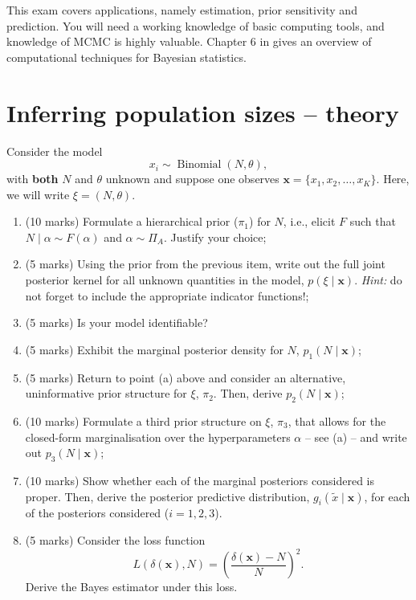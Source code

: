 \documentclass[a4paper,10pt, notitlepage]{report}
\begin{document}
This exam covers applications, namely estimation, prior sensitivity and prediction.
You will need a working knowledge of basic computing tools, and knowledge of MCMC is highly valuable.
Chapter 6 in \cite{Robert2007} gives an overview of computational techniques for Bayesian statistics.

\section*{Inferring population sizes -- theory}

Consider the model
\begin{equation*}
 x_i \sim \operatorname{Binomial}(N, \theta),
\end{equation*}
with \textbf{both} $N$ and $\theta$ unknown and suppose one observes $\boldsymbol{x} = \{x_1, x_2, \ldots, x_K\}$.
Here, we will write $\xi = (N, \theta)$.

\begin{enumerate}[label=\alph*)]
 \item (10 marks) Formulate a hierarchical prior ($\pi_1$) for $N$, i.e., elicit $F$ such that $N \mid \alpha \sim F(\alpha)$ and $\alpha  \sim \Pi_A$.
 Justify your choice; 
 \item (5 marks) Using the prior from the previous item, write out the full joint posterior kernel for all unknown quantities in the model, $p(\xi \mid \boldsymbol{x})$. \textit{Hint:} do not forget to include the appropriate indicator functions!;
 \item (5 marks) Is your model identifiable?
 \item (5 marks) Exhibit the marginal posterior density for $N$, $p_1(N \mid \boldsymbol{x})$;
 \item (5 marks) Return to point (a) above and consider an alternative, uninformative prior structure for $\xi$, $\pi_2$.
 Then, derive $p_2(N \mid \boldsymbol{x})$;
 \item (10 marks) Formulate a third prior structure on $\xi$, $\pi_3$, that allows for the closed-form marginalisation over the hyperparameters $\alpha$ -- see (a) -- and write out $p_3(N \mid \boldsymbol{x})$;
 \item (10 marks) Show whether each of the marginal posteriors considered is proper.
 Then, derive the posterior predictive distribution, $g_i(\tilde{x} \mid \boldsymbol{x})$, for each of the posteriors considered ($i = 1, 2, 3$).
 \item (5 marks) Consider the loss function
 \begin{equation}
 \label{eq:relative_loss}
  L(\delta(\boldsymbol{x}), N) = \left(\frac{\delta(\boldsymbol{x})-N}{N} \right)^2.
 \end{equation}
 Derive the Bayes estimator under this loss.
\end{enumerate}
\end{document}
